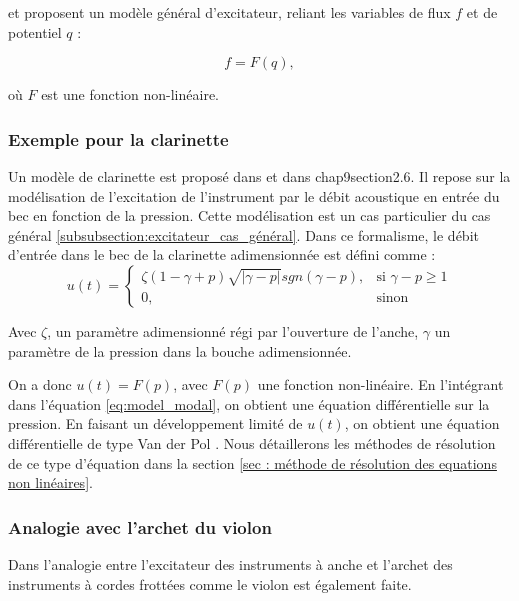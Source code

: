 \documentclass[atiam, article]{rapport} %
\begin{document}
\cite{mcintyre_oscillations_1983} et \cite{maganza_bifurcations_1986} proposent un modèle général d'excitateur, reliant les variables de flux $f$ et de potentiel $q$ :

\begin{equation}
    f=F(q),
\end{equation}

où $F$ est une fonction non-linéaire.

\subsubsection{Exemple pour la clarinette}
Un modèle de clarinette est proposé dans \cite{missoum_explicit_2014} et dans \cite{chaigne2008acoustique} chap9section2.6. Il repose sur la modélisation de l'excitation de l'instrument par le débit acoustique en entrée du bec en fonction de la pression. Cette modélisation est un cas particulier du cas général \ref{subsubsection:excitateur_cas_général}. 
Dans ce formalisme, le débit d'entrée dans le bec de la clarinette adimensionnée est défini comme : \\

\begin{equation}
    u(t) = \begin{cases}
    \zeta(1-\gamma+p)\sqrt{|\gamma-p|}sgn(\gamma-p),& \text{si }\gamma-p\geq 1\\
    0,              & \text{sinon}
\end{cases}
\end{equation}

Avec $\zeta$, un paramètre adimensionné régi par l'ouverture de l'anche, $\gamma$ un paramètre de la pression dans la bouche adimensionnée. 

On a donc $u(t) = F(p)$, avec $F(p)$ une fonction non-linéaire. En l'intégrant dans l'équation \ref{eq:model_modal}, on obtient une équation différentielle sur la pression. En faisant un développement limité de $u(t)$, on obtient une équation différentielle de type Van der Pol \cite{chaigne2008acoustique}.  Nous détaillerons les méthodes de résolution de ce type d'équation dans la section \ref{sec : méthode de résolution des equations non linéaires}. 

\subsubsection{Analogie avec l'archet du violon}

Dans \cite{ollivier_idealized_2004} l'analogie entre l'excitateur des instruments à anche et l'archet des instruments à cordes frottées comme le violon est également faite. 
\end{document}
